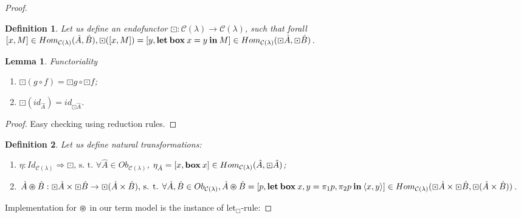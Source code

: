 \documentclass[a4paper]{article}
\newtheorem{lemma}{Lemma}
\newtheorem{defin}{Definition}
\begin{document}
\begin{proof}
\begin{defin}
  Let us define an endofunctor $\boxdot : \mathcal{C}(\lambda) \to \mathcal{C}(\lambda)$, such that
forall $[x,M] \in Hom_{\mathcal{C}(\lambda)}(\hat{A},\hat{B}), \boxdot ([x,M]) = [y, {\bf let \: box \:} x = y {\: \bf in \:} M] \in Hom_{\mathcal{C}(\lambda)}(\boxdot \hat{A}, \boxdot \hat{B})$.

\end{defin}

\begin{lemma} Functoriality

\begin{enumerate}
  \item $\boxdot(g \circ f) = \boxdot g \circ \boxdot f$;
  \item $\boxdot (id_{\hat{A}}) = id_{\boxdot \hat{A}}$.
\end{enumerate}
\end{lemma}

\begin{proof}

Easy checking using reduction rules.

\end{proof}

\begin{defin}

  Let us define natural transformations:

\begin{enumerate}
  \item $\eta: Id_{\mathcal{C}(\lambda)} \Rightarrow \boxdot\text{, s. t. }\forall \hat{A} \in Ob_{\mathcal{C}(\lambda)}$, $\eta_{\hat{A}} = [x, {\bf box \:} x] \in Hom_{\mathcal{C}(\lambda)}(\hat{A}, \boxdot \hat{A})$;
  \item $\hat{A} \varoast \hat{B} : \boxdot \hat{A} \times \boxdot \hat{B} \to \boxdot (\hat{A} \times \hat{B})\text{, s. t. } \forall \hat{A}, \hat{B} \in Ob_{\mathcal{C}(\lambda)}, \hat{A} \varoast \hat{B} = [p, {\bf let \: box \:} x,y = \pi_1 p, \pi_2 p {\: \bf in \:} \langle x, y \rangle] \in Hom_{\mathcal{C}(\lambda)}(\boxdot \hat{A} \times \boxdot \hat{B}, \boxdot (\hat{A} \times \hat{B}))$.
\end{enumerate}
\end{defin}

Implementation for $\varoast$ in our term model is the instance of ${\text{let}_{\Box}}$-rule:


\end{proof}
\end{document}
